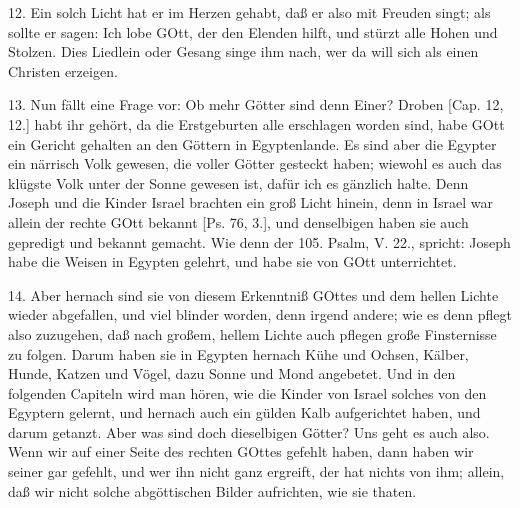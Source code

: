 12. Ein solch Licht hat er im Herzen gehabt, daß er also mit Freuden singt; als sollte er sagen: Ich lobe GOtt, der den Elenden hilft, und stürzt alle Hohen und Stolzen. Dies Liedlein oder Gesang singe ihm nach, wer da will sich als einen Christen erzeigen.

13. Nun fällt eine Frage vor: Ob mehr Götter sind denn Einer? Droben [Cap. 12, 12.] habt ihr gehört, da die Erstgeburten alle erschlagen worden sind, habe GOtt ein Gericht gehalten an den Göttern in Egyptenlande. Es sind aber die Egypter ein närrisch Volk gewesen, die voller Götter gesteckt haben; wiewohl es auch das klügste Volk unter der Sonne gewesen ist, dafür ich es gänzlich halte. Denn Joseph und die Kinder Israel brachten ein groß Licht hinein, denn in Israel war allein der rechte GOtt bekannt [Ps. 76, 3.], und denselbigen haben sie auch gepredigt und bekannt gemacht. Wie denn der 105. Psalm, V. 22., spricht: Joseph habe die Weisen in Egypten gelehrt, und habe sie von GOtt unterrichtet.

14. Aber hernach sind sie von diesem Erkenntniß GOttes und dem hellen Lichte wieder abgefallen, und viel blinder worden, denn irgend andere; wie es denn pflegt also zuzugehen, daß nach großem, hellem Lichte auch pflegen große Finsternisse zu folgen. Darum haben sie in Egypten hernach Kühe und Ochsen, Kälber, Hunde, Katzen und Vögel, dazu Sonne und Mond angebetet. Und in den folgenden Capiteln wird man hören, wie die Kinder von Israel solches von den Egyptern gelernt, und hernach auch ein gülden Kalb aufgerichtet haben, und darum getanzt. Aber was sind doch dieselbigen Götter? Uns geht es auch also. Wenn wir auf einer Seite des rechten GOttes gefehlt haben, dann haben wir seiner gar gefehlt, und wer ihn nicht ganz ergreift, der hat nichts von ihm; allein, daß wir nicht solche abgöttischen Bilder aufrichten, wie sie thaten.


